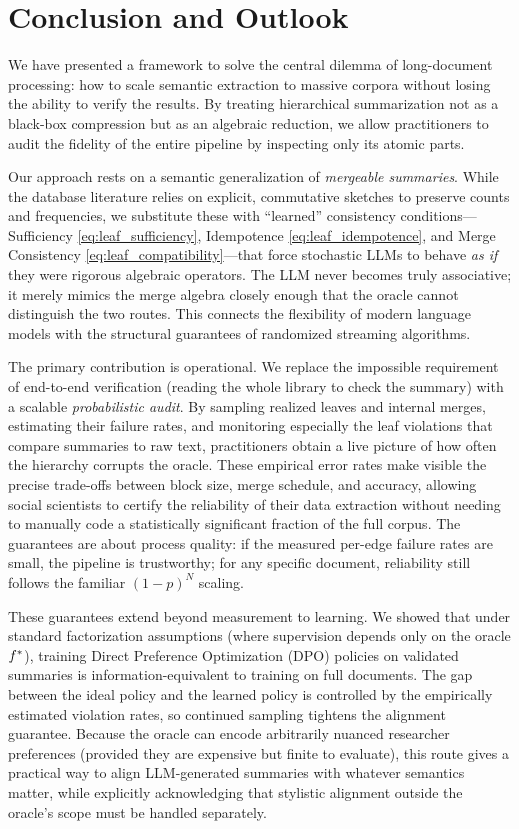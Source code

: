\section{Conclusion and Outlook}\label{sec:conclusion}

We have presented a framework to solve the central dilemma of long-document processing: how to scale semantic extraction to massive corpora without losing the ability to verify the results. By treating hierarchical summarization not as a black-box compression but as an algebraic reduction, we allow practitioners to audit the fidelity of the entire pipeline by inspecting only its atomic parts.

Our approach rests on a semantic generalization of \emph{mergeable summaries}. While the database literature relies on explicit, commutative sketches to preserve counts and frequencies, we substitute these with ``learned'' consistency conditions---Sufficiency \ref{eq:leaf_sufficiency}, Idempotence \ref{eq:leaf_idempotence}, and Merge Consistency \ref{eq:leaf_compatibility}---that force stochastic LLMs to behave \emph{as if} they were rigorous algebraic operators. The LLM never becomes truly associative; it merely mimics the merge algebra closely enough that the oracle cannot distinguish the two routes. This connects the flexibility of modern language models with the structural guarantees of randomized streaming algorithms.

The primary contribution is operational. We replace the impossible requirement of end-to-end verification (reading the whole library to check the summary) with a scalable \emph{probabilistic audit}. By sampling realized leaves and internal merges, estimating their failure rates, and monitoring especially the leaf violations that compare summaries to raw text, practitioners obtain a live picture of how often the hierarchy corrupts the oracle. These empirical error rates make visible the precise trade-offs between block size, merge schedule, and accuracy, allowing social scientists to certify the reliability of their data extraction without needing to manually code a statistically significant fraction of the full corpus. The guarantees are about process quality: if the measured per-edge failure rates are small, the pipeline is trustworthy; for any specific document, reliability still follows the familiar $(1-p)^N$ scaling.

These guarantees extend beyond measurement to learning. We showed that under standard factorization assumptions (where supervision depends only on the oracle $f^{\ast}$), training Direct Preference Optimization (DPO) policies on validated summaries is information-equivalent to training on full documents. The gap between the ideal policy and the learned policy is controlled by the empirically estimated violation rates, so continued sampling tightens the alignment guarantee. Because the oracle can encode arbitrarily nuanced researcher preferences (provided they are expensive but finite to evaluate), this route gives a practical way to align LLM-generated summaries with whatever semantics matter, while explicitly acknowledging that stylistic alignment outside the oracle's scope must be handled separately.

